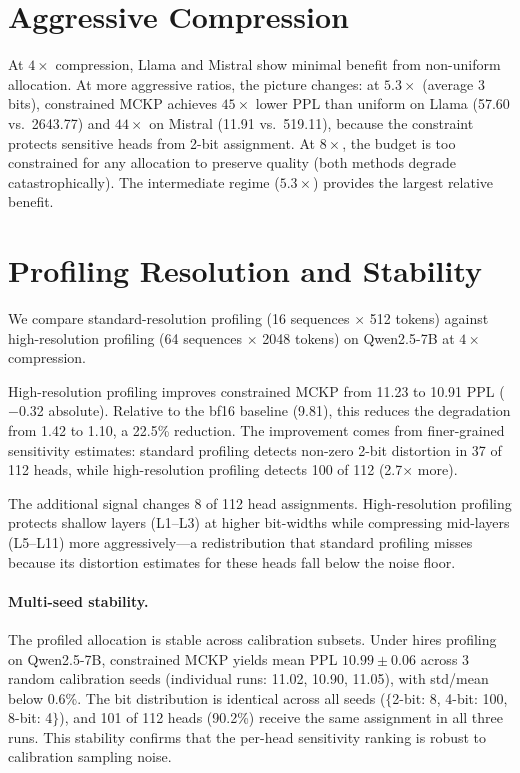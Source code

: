 \section{Aggressive Compression}
\label{sec:aggressive}

At $4\times$ compression, Llama and Mistral show minimal benefit from non-uniform allocation.
At more aggressive ratios, the picture changes: at $5.3\times$ (average 3 bits), constrained MCKP achieves $45\times$ lower PPL than uniform on Llama (57.60 vs.\ 2643.77) and $44\times$ on Mistral (11.91 vs.\ 519.11), because the constraint protects sensitive heads from 2-bit assignment.
At $8\times$, the budget is too constrained for any allocation to preserve quality (both methods degrade catastrophically).
The intermediate regime ($5.3\times$) provides the largest relative benefit.

\section{Profiling Resolution and Stability}
\label{sec:profiling_resolution}

We compare standard-resolution profiling (16 sequences $\times$ 512 tokens) against high-resolution profiling (64 sequences $\times$ 2048 tokens) on Qwen2.5-7B at $4\times$ compression.

High-resolution profiling improves constrained MCKP from 11.23 to 10.91 PPL ($-$0.32 absolute).
Relative to the bf16 baseline (9.81), this reduces the degradation from 1.42 to 1.10, a 22.5\% reduction.
The improvement comes from finer-grained sensitivity estimates: standard profiling detects non-zero 2-bit distortion in 37 of 112 heads, while high-resolution profiling detects 100 of 112 (2.7$\times$ more).

The additional signal changes 8 of 112 head assignments.
High-resolution profiling protects shallow layers (L1--L3) at higher bit-widths while compressing mid-layers (L5--L11) more aggressively---a redistribution that standard profiling misses because its distortion estimates for these heads fall below the noise floor.

\paragraph{Multi-seed stability.}
The profiled allocation is stable across calibration subsets.
Under hires profiling on Qwen2.5-7B, constrained MCKP yields mean PPL $10.99 \pm 0.06$ across 3 random calibration seeds (individual runs: 11.02, 10.90, 11.05), with std/mean below 0.6\%.
The bit distribution is identical across all seeds ($\{$2-bit: 8, 4-bit: 100, 8-bit: 4$\}$), and 101 of 112 heads (90.2\%) receive the same assignment in all three runs.
This stability confirms that the per-head sensitivity ranking is robust to calibration sampling noise.

